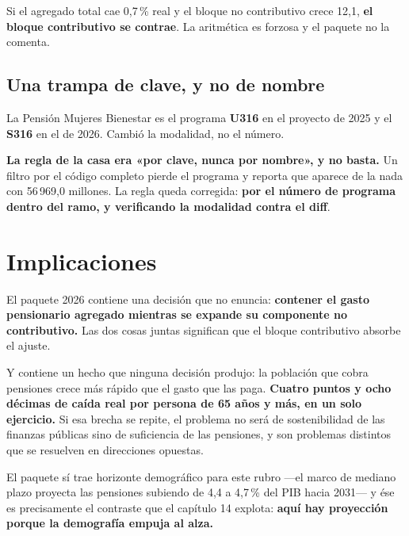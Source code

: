 Si el agregado total cae 0,7\,\% real y el bloque no contributivo crece 12,1, \textbf{el
bloque contributivo se contrae}. La aritmética es forzosa y el paquete no la comenta.

\subsection{Una trampa de clave, y no de nombre}

La Pensión Mujeres Bienestar es el programa \textbf{U316} en el proyecto de 2025 y el
\textbf{S316} en el de 2026. Cambió la modalidad, no el número.

\textbf{La regla de la casa era «por clave, nunca por nombre», y no basta.} Un filtro por el
código completo pierde el programa y reporta que aparece de la nada con 56\,969,0 millones. La
regla queda corregida: \textbf{por el número de programa dentro del ramo, y verificando la
modalidad contra el diff}.

\section{Implicaciones}

El paquete 2026 contiene una decisión que no enuncia: \textbf{contener el gasto pensionario
agregado mientras se expande su componente no contributivo.} Las dos cosas juntas significan
que el bloque contributivo absorbe el ajuste.

Y contiene un hecho que ninguna decisión produjo: la población que cobra pensiones crece más
rápido que el gasto que las paga. \textbf{Cuatro puntos y ocho décimas de caída real por
persona de 65 años y más, en un solo ejercicio.} Si esa brecha se repite, el problema no será
de sostenibilidad de las finanzas públicas sino de suficiencia de las pensiones, y son
problemas distintos que se resuelven en direcciones opuestas.

El paquete sí trae horizonte demográfico para este rubro ---el marco de mediano plazo proyecta
las pensiones subiendo de 4,4 a 4,7\,\% del PIB hacia 2031--- y ése es precisamente el
contraste que el capítulo 14 explota: \textbf{aquí hay proyección porque la demografía empuja
al alza.}

